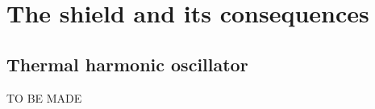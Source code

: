 \chapter{The shield and its consequences}

\section{Thermal harmonic oscillator}\label{apx:thermal-harmonic-oscillator}

TO BE MADE